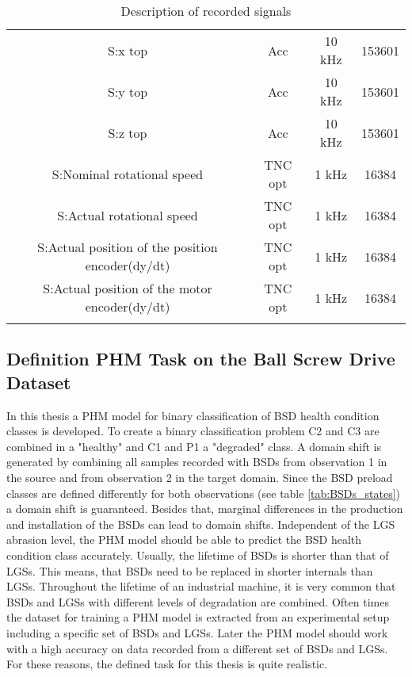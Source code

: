 \begin{center}
\begin{longtable}{c c c c}
 S:x top & Acc & 10 kHz & 153601 \\ 

 S:y top & Acc & 10 kHz & 153601 \\ 
 
 S:z top & Acc & 10 kHz & 153601 \\ 
 
 S:Nominal rotational speed & TNC opt & 1 kHz & 16384 \\
 
 S:Actual rotational speed & TNC opt & 1 kHz & 16384 \\ 
 
 S:Actual position of the position encoder(dy/dt) & TNC opt & 1 kHz & 16384 \\ 
 S:Actual position of the motor encoder(dy/dt)  & TNC opt & 1 kHz & 16384  \\ [1ex] 
 \bottomrule
\caption {Description of recorded signals}
\label {tab:description_of_the_49_recorded_features}
\end{longtable}
\end{center}


\subsection{Definition PHM Task on the Ball Screw Drive Dataset}
In this thesis a PHM model for binary classification of BSD health condition classes is developed. To create a binary classification problem C2 and C3 are combined in a "healthy" and C1 and P1 a "degraded" class. A domain shift is generated by combining all samples recorded with BSDs from observation 1 in the source and from observation 2 in the target domain. Since the BSD preload classes are defined differently for both observations (see table \ref{tab:BSDs_states}) a domain shift is guaranteed. Besides that, marginal differences in the production and installation of the BSDs can lead to domain shifts. Independent of the LGS abrasion level, the PHM model should be able to predict the BSD health condition class accurately. Usually, the lifetime of BSDs is shorter than that of LGSs. This means, that BSDs need to be replaced in shorter internals than LGSs. Throughout the lifetime of an industrial machine, it is very common that BSDs and LGSs with different levels of degradation are combined. Often times the dataset for training a PHM model is extracted from an experimental setup including a specific set of BSDs and LGSs. Later the PHM model should work with a high accuracy on data recorded from a different set of BSDs and LGSs. For these reasons, the defined task for this thesis is quite realistic.

